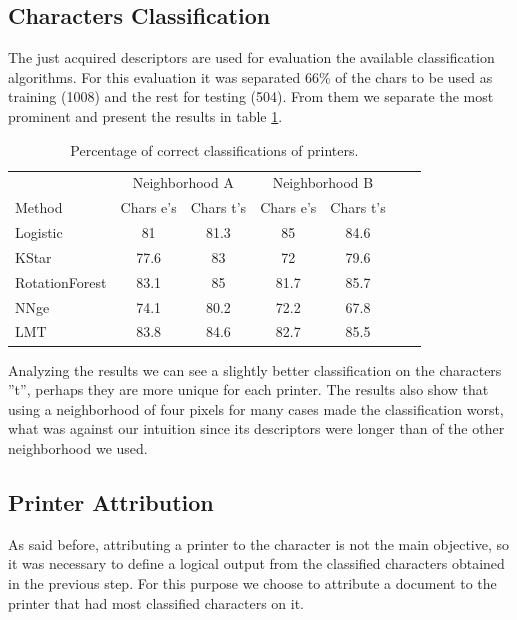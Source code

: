 \documentclass[10pt,twocolumn,letterpaper]{article}
\begin{document}
\subsection{Characters Classification}

The just acquired descriptors are used for evaluation the available classification algorithms. For this evaluation it was separated 66\% of the chars to be used as training (1008) and the rest for testing (504). From them we separate the most prominent and present the results in table \ref{tab:correct_classification}.

\begin{table}
\caption{Percentage of correct classifications of printers.}
\label{tab:correct_classification}
\begin{center}
\begin{small} 
\setlength{\tabcolsep}{3pt} 
\begin{tabular}{l*{5}{c}r} & \multicolumn{2}{c}{Neighborhood A} & \multicolumn{2}{c}{Neighborhood B}\\ \cline{1-5}
Method & Chars e’s & Chars t’s & Chars e’s & Chars t’s \\
\hline
Logistic & 81 & 81.3 & 85 & 84.6\\
KStar & 77.6 & 83 & 72 & 79.6\\
RotationForest & 83.1 & 85 & 81.7 & 85.7\\
NNge & 74.1 & 80.2 & 72.2 & 67.8\\
LMT & 83.8 & 84.6 & 82.7 & 85.5\\

\end{tabular}
\end{small}
\end{center}
\end{table}

Analyzing the results we can see a slightly better classification on the characters ''t'', perhaps they are more unique for each printer. The results also show that using a neighborhood of four pixels for many cases made the classification worst, what was against our intuition since its descriptors were longer than of the other neighborhood we used.

\subsection{Printer Attribution}

As said before, attributing a printer to the character is not the main objective, so it was necessary to define a logical output from the classified characters obtained in the previous step. For this purpose we choose to attribute a document to the printer that had most classified characters on it.
\end{document}
